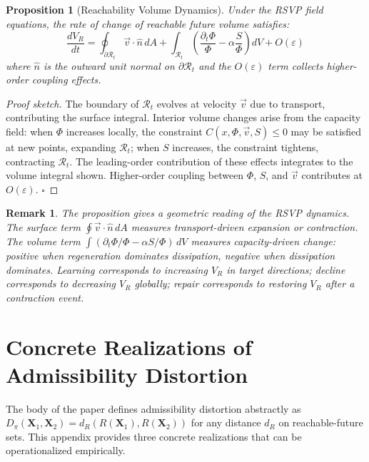 \documentclass[12pt,a4paper]{article}
\newtheorem{proposition}[theorem]{Proposition}
\newtheorem{remark}[theorem]{Remark}
\begin{document}
\begin{proposition}[Reachability Volume Dynamics]
\label{prop:reachability-volume}
Under the RSVP field equations, the rate of change of reachable future volume satisfies:
\[
\frac{dV_R}{dt} = \oint_{\partial \mathcal{R}_t} \vec{v} \cdot \hat{n}\, dA + \int_{\mathcal{R}_t} \left(\frac{\partial_t \Phi}{\Phi} - \alpha \frac{S}{\Phi}\right) dV + O(\varepsilon)
\]
where $\hat{n}$ is the outward unit normal on $\partial\mathcal{R}_t$ and the $O(\varepsilon)$ term collects higher-order coupling effects.
\end{proposition}

\begin{proof}[Proof sketch]
The boundary of $\mathcal{R}_t$ evolves at velocity $\vec{v}$ due to transport, contributing the surface integral. Interior volume changes arise from the capacity field: when $\Phi$ increases locally, the constraint $C(x,\Phi,\vec{v},S)\leq 0$ may be satisfied at new points, expanding $\mathcal{R}_t$; when $S$ increases, the constraint tightens, contracting $\mathcal{R}_t$. The leading-order contribution of these effects integrates to the volume integral shown. Higher-order coupling between $\Phi$, $S$, and $\vec{v}$ contributes at $O(\varepsilon)$. $\square$
\end{proof}

\begin{remark}
The proposition gives a geometric reading of the RSVP dynamics. The surface term $\oint \vec{v}\cdot\hat{n}\,dA$ measures transport-driven expansion or contraction. The volume term $\int(\partial_t\Phi/\Phi - \alpha S/\Phi)\,dV$ measures capacity-driven change: positive when regeneration dominates dissipation, negative when dissipation dominates. Learning corresponds to increasing $V_R$ in target directions; decline corresponds to decreasing $V_R$ globally; repair corresponds to restoring $V_R$ after a contraction event.
\end{remark}

\section{Concrete Realizations of Admissibility Distortion}
\label{app:distortion}

The body of the paper defines admissibility distortion abstractly as $D_\pi(\mathbf{X}_1, \mathbf{X}_2) = d_R(R(\mathbf{X}_1), R(\mathbf{X}_2))$ for any distance $d_R$ on reachable-future sets. This appendix provides three concrete realizations that can be operationalized empirically.
\end{document}
